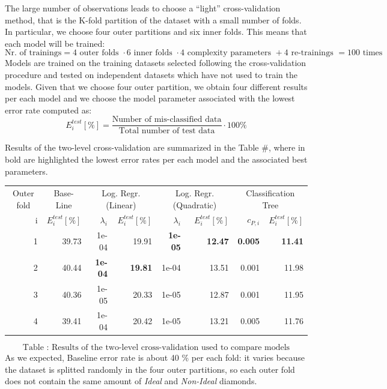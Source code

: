 \documentclass[
]{article}
\begin{document}
The large number of observations leads to choose a ``light''
cross-validation method, that is the K-fold partition of the dataset
with a small number of folds. In particular, we choose four outer
partitions and six inner folds. This means that each model will be
trained: \[
\text{Nr. of trainings} = 4 \text{ outer folds } \cdot 6 \text{ inner folds } \cdot 4 \text{ complexity parameters } + 4 \text{ re-trainings } = 100 \text{ times}
\] Models are trained on the training datasets selected following the
cross-validation procedure and tested on independent datasets which have
not used to train the models. Given that we choose four outer partition,
we obtain four different results per each model and we choose the model
parameter associated with the lowest error rate computed as: \[
E_i^{test} [\%] = \frac{\text{Number of mis-classified data}}{\text{Total number of test data}} \cdot 100 \%
\]

Results of the two-level cross-validation are summarized in the Table
\#, where in bold are highlighted the lowest error rates per each model
and the associated best parameters.

\begin{center}
\begin{tabular}{rrrrrrrr}
\toprule
\multicolumn{1}{c}{Outer fold} & \multicolumn{1}{c}{Base-Line} & \multicolumn{2}{c}{Log. Regr. (Linear)} & \multicolumn{2}{c}{Log. Regr. (Quadratic)} & \multicolumn{2}{c}{Classification Tree} \\
\cmidrule(l{3pt}r{3pt}){1-1} \cmidrule(l{3pt}r{3pt}){2-2} \cmidrule(l{3pt}r{3pt}){3-4} \cmidrule(l{3pt}r{3pt}){5-6} \cmidrule(l{3pt}r{3pt}){7-8}
i & {$E_i^{test} [\%]$} & {$\lambda_i$} & {$E_i^{test} [\%]$} & {$\lambda_i$} & {$E_i^{test} [\%]$} & {$c_{P,i}$} & {$E_i^{test} [\%]$}\\
\midrule
1 & 39.73 & 1e-04 & 19.91 & \textbf{1e-05} & \textbf{12.47} & \textbf{0.005} & \textbf{11.41}\\
2 & 40.44 & \textbf{1e-04} & \textbf{19.81} & 1e-04 & 13.51 & 0.001 & 11.98\\
3 & 40.36 & 1e-05 & 20.33 & 1e-05 & 12.87 & 0.001 & 11.95\\
4 & 39.41 & 1e-04 & 20.42 & 1e-05 & 13.21 & 0.005 & 11.76\\
\bottomrule
\end{tabular}
\end{center}

\[
\text{Table : Results of the two-level cross-validation used to compare models}
\] As we expected, Baseline error rate is about 40 \% per each fold: it
varies because the dataset is splitted randomly in the four outer
partitions, so each outer fold does not contain the same amount of
\emph{Ideal} and \emph{Non-Ideal} diamonds.
\end{document}

